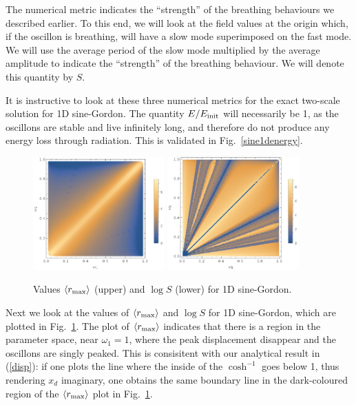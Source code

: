 \documentclass{report}
\begin{document}
The numerical metric indicates the ``strength'' of the breathing behaviours we described earlier. To this end, we will look at the field values at the origin which, if the oscillon is breathing, will have a slow mode superimposed on the fast mode. We will use the average period of the slow mode multiplied by the average amplitude to indicate the ``strength'' of the breathing behaviour. We will denote this quantity by $S$.

It is instructive to look at these three numerical metrics for the exact two-scale solution for 1D sine-Gordon. The quantity $E/E_{\rm init}$ will necessarily be 1, as the oscillons are stable and live infinitely long, and therefore do not produce any energy loss through radiation. This is validated in Fig.~\ref{sine1denergy}.

\begin{figure}
  \centering
  \includegraphics[width=0.45\textwidth]{plot/r_max-sine-1d.png}
  \includegraphics[width=0.45\textwidth]{plot/slow-mode-sine-1d.png}
  \caption{Values $\langle r_{\rm max}\rangle$ (upper) and  $\log{S}$ (lower) for 1D sine-Gordon.}\label{sine-1d}
\end{figure}

Next we look at the values of $\langle r_{\rm max}\rangle$ and $\log{S}$ for 1D sine-Gordon, which are plotted in Fig.~\ref{sine-1d}. The plot of $\langle r_{\rm max}\rangle$ indicates that there is a region in the parameter space, near $\omega_1=1$, where the peak displacement disappear and the oscillons are singly peaked. This is consisitent with our analytical result in (\ref{disp}): if one plots the line where the inside of the $\cosh^{-1}$ goes below 1, thus rendering $x_d$ imaginary, one obtains the same boundary line in the dark-coloured region of the $\langle r_{\rm max}\rangle$ plot in Fig.~\ref{sine-1d}.
\end{document}
